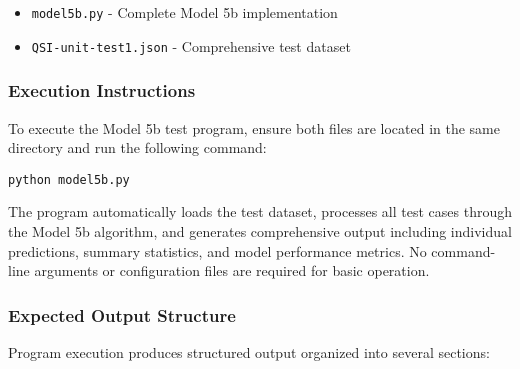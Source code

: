 \begin{itemize}
    \item \texttt{model5b.py} - Complete Model 5b implementation
    \item \texttt{QSI-unit-test1.json} - Comprehensive test dataset
\end{itemize}

\subsubsection{Execution Instructions}

To execute the Model 5b test program, ensure both files are located in the same directory and run the following command:

\begin{verbatim}
python model5b.py
\end{verbatim}

The program automatically loads the test dataset, processes all test cases through the Model 5b algorithm, and generates comprehensive output including individual predictions, summary statistics, and model performance metrics. No command-line arguments or configuration files are required for basic operation.

\subsubsection{Expected Output Structure}

Program execution produces structured output organized into several sections:

